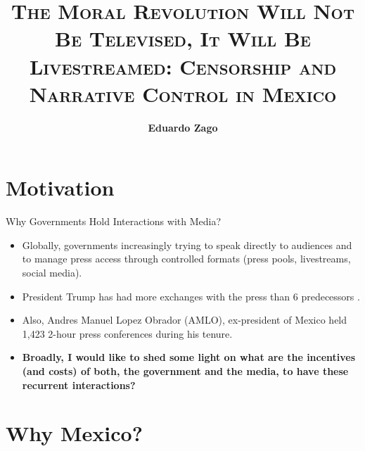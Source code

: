 \documentclass[10pt,aspectratio=169]{beamer}
\title{\Large\textsc{The Moral Revolution Will Not Be Televised, It Will Be Livestreamed: Censorship and Narrative Control in Mexico}}
\author[Zago] %
{\textbf{Eduardo Zago}\inst{1}  \vspace{10pt}}
\institute []%
{  \inst{1}   PhD Student NYU Politics}
\date{\textsc{}}
\begin{document}
\maketitle









\section{Motivation}


\begin{frame}{Why Governments Hold Interactions with Media?}
\begin{itemize}
  \setlength\itemsep{1em}

    \item Globally, governments increasingly trying to speak \alert{directly} to audiences and to \alert{manage press access} through controlled formats (press pools, livestreams, social media).
    \item President Trump has had more exchanges with the press than 6 predecessors {\footnotesize\color{gray}\citep{Trump100Days}}. 
    \item Also, Andres Manuel Lopez Obrador (AMLO), ex-president of Mexico held 1,423 2-hour press conferences during his tenure.
    \item \textbf{Broadly, I would like to shed some light on what are the incentives (and costs) of both, the government and the media, to have these recurrent interactions?}

    
\end{itemize}
\end{frame}


\section{Why Mexico?}
\end{document}
